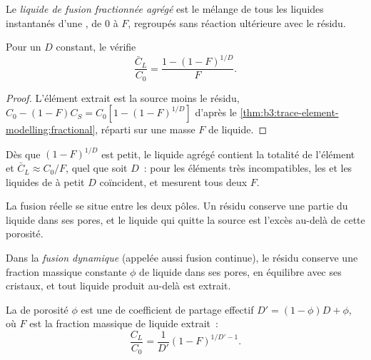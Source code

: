 \begin{definition}\label{def:b3:trace-element-modelling:fractional}
Le \emph{liquide de fusion fractionnée agrégé} est le
mélange de tous les liquides instantanés d'une , de $0$ à
$F$, regroupés sans réaction ultérieure avec le résidu.
\end{definition}

\begin{proposition}
\label{prop:b3:trace-element-modelling:aggregate}
Pour un $D$ constant, le  vérifie
\[
\frac{\bar C_L}{C_0} = \frac{1 - (1 - F)^{1/D}}{F}.
\]
\end{proposition}

\begin{proof}
L'élément extrait est la source moins le résidu,
$C_0 - (1 - F)C_S = C_0[1 - (1 - F)^{1/D}]$ d'après le \cref{thm:b3:trace-element-modelling:fractional},
réparti sur une masse $F$ de liquide.
\end{proof}

Dès que $(1 - F)^{1/D}$ est petit, le liquide agrégé contient la totalité de
l'élément et $\bar C_L \approx C_0/F$, quel que soit $D$~: pour les éléments très
incompatibles, les  et les liquides de  à petit $D$ coïncident, et mesurent tous deux $F$.

La fusion réelle se situe entre les deux pôles. Un résidu conserve une partie du
liquide dans ses pores, et le liquide qui quitte la source est l'excès au-delà de cette porosité.

\begin{definition}\label{def:b3:trace-element-modelling:dynamic}
Dans la \emph{fusion dynamique} (appelée aussi fusion
continue), le résidu conserve une fraction massique constante $\phi$ de liquide
dans ses pores, en équilibre avec ses cristaux, et tout liquide produit au-delà
est extrait.
\end{definition}

\begin{proposition}\label{prop:b3:trace-element-modelling:dynamic}
La  de porosité $\phi$ est une  de coefficient de
partage effectif $D' = (1 - \phi)D + \phi$, où $F$ est la fraction massique de
liquide extrait~:
\[
\frac{C_L}{C_0} = \frac{1}{D'}(1 - F)^{1/D' - 1}.
\]
\end{proposition}

